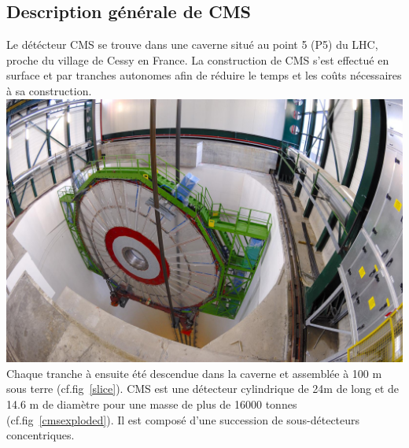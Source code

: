 \subsection{Description générale de CMS}
Le détécteur CMS se trouve dans une caverne situé au point 5 (P5) du LHC, proche du village de Cessy en France. La construction de CMS s'est effectué en surface et par tranches autonomes afin de réduire le temps et les coûts nécessaires à sa construction.
\marginpar
{
	\centering
	\includegraphics[width=\marginparwidth]{CMS/slice.jpg}
	\label{slice}
}
Chaque tranche à ensuite été descendue dans la caverne et assemblée à 100 m sous terre (cf.fig~\ref{slice}).
CMS est une détecteur cylindrique de 24m de long et de 14.6 m de diamètre pour une masse de plus de 16000 tonnes (cf.fig~\ref{cmsexploded}). Il est composé d'une succession de sous-détecteurs concentriques.

